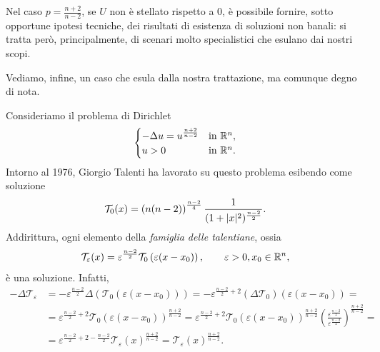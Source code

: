 \begin{osservazione}
Nel caso $p= \frac{n+2}{n-2}$, se $U$ non è stellato rispetto a $0$, è possibile fornire, sotto opportune ipotesi tecniche, dei risultati di esistenza di soluzioni non banali: si tratta però, principalmente, di scenari molto specialistici che esulano dai nostri scopi.
\end{osservazione}

Vediamo, infine, un caso che esula dalla nostra trattazione, ma comunque degno di nota.
\begin{esempio}
Consideriamo il problema di Dirichlet
\[ 	\begin{cases}
	-\Delta u = u^{\frac{n+2}{n-2}} & \textup{in } \mathbb{R}^n,\\
	u > 0 & \textup{in } \mathbb{R}^n.\\
\end{cases} \]
Intorno al 1976, Giorgio Talenti ha lavorato su questo problema esibendo come soluzione
\[ \mathcal{T}_0(x) = \left( n(n-2)\right) ^{\frac{n-2}{4}} \frac{1}{(1+\lvert x\rvert^2)^{\frac{n-2}{2}}}.\]
Addirittura, ogni elemento della \emph{famiglia delle talentiane}, ossia  
\[ \mathcal{T}_\varepsilon(x) = \varepsilon^{\frac{n-2}{2}}\mathcal{T}_0\left( \varepsilon(x-x_0)\right), \qquad \varepsilon>0,x_0\in \mathbb{R}^n, \]
è una soluzione. Infatti, 
\begin{align*}
 -\Delta \mathcal{T}_\varepsilon &= -\varepsilon^{\frac{n-2}{2}} \Delta \left(\mathcal{T}_0\left( \varepsilon(x-x_0)\right)  \right) = -\varepsilon^{\frac{n-2}{2}+ 2} (\Delta \mathcal{T}_0)(\varepsilon(x-x_0)) = \\
 &= \varepsilon^{\frac{n-2}{2}+2} \mathcal{T}_0\left( \varepsilon(x-x_0)\right)^{\frac{n+2}{n-2}} = \varepsilon^{\frac{n-2}{2}+2} \mathcal{T}_0\left( \varepsilon(x-x_0)\right)^{\frac{n+2}{n-2}} \left( \frac{\varepsilon^{\frac{n-2}{2}}}{\varepsilon^{\frac{n-2}{2}}}\right)^{\frac{n+2}{n-2}} = \\
 &=\varepsilon^{\frac{n-2}{2}+2 -\frac{n-2}{2}}\mathcal{T}_\varepsilon(x)^{\frac{n+2}{n-2}} = \mathcal{T}_\varepsilon(x)^{\frac{n+2}{n-2}}. 
\end{align*}
\end{esempio}